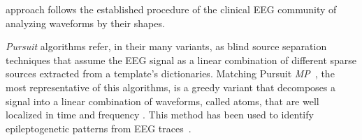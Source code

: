 approach follows the established procedure of the clinical EEG community of analyzing waveforms by their shapes.




%
%


%



\textit{Pursuit} algorithms refer, in their many variants, as blind source separation \cite{Vincent2010} techniques that assume the EEG signal as a linear combination of different sparse sources extracted from a template's dictionaries.  Matching Pursuit \textit{MP}~\cite{Mallat1993}, the most representative of this algorithms, is a greedy variant that decomposes a signal into a linear combination of waveforms, called atoms, that are well localized in time and frequency \cite{ChandranKS2016}.  This method has been used to identify epileptogenetic patterns from EEG traces~\cite{Vareka2012}.

